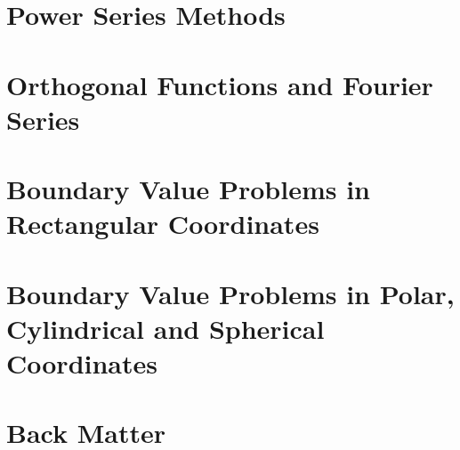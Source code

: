 \documentclass{tufte-book}
\theoremstyle{break}
\begin{document}
\part{Power Series Methods}













\part{Orthogonal Functions and Fourier Series}









\part{Boundary Value Problems in Rectangular Coordinates}














\part{Boundary Value Problems in Polar, Cylindrical and Spherical Coordinates}




\part{Back Matter}
\backmatter





\appendix
\appendixpage
\noappendicestocpagenum
\addappheadtotoc
\end{document}
